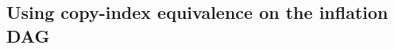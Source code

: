 \documentclass[aps,english,10pt,superscriptaddress,onecolumn,twoside,longbibliography,pra,floatfix,fleqn,nofootinbib]{revtex4-1}%
\theoremstyle{definition}
\newcounter{example}[section]
\begin{document}

\subsection{Using copy-index equivalence on the inflation DAG}\label{Sec:copyindexequivalence}
\end{document}
